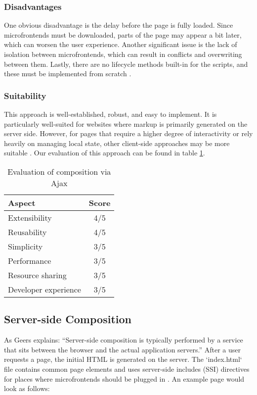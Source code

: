 \subsubsection{Disadvantages}
One obvious disadvantage is the delay before the page is fully loaded. Since microfrontends must be downloaded, parts of the page may appear a bit later, which can worsen the user experience. Another significant issue is the lack of isolation between microfrontends, which can result in conflicts and overwriting between them. Lastly, there are no lifecycle methods built-in for the scripts, and these must be implemented from scratch \cite{Geers}.

\subsubsection{Suitability}
This approach is well-established, robust, and easy to implement. It is particularly well-suited for websites where markup is primarily generated on the server side. However, for pages that require a higher degree of interactivity or rely heavily on managing local state, other client-side approaches may be more suitable \cite{Geers}. Our evaluation of this approach can be found in table \ref{table:ajax-evaluation}.

\begin{table}[h]
  \centering
  \begin{tabular}{|p{4cm}|c|}
    \hline
      \textbf{Aspect} & \textbf{Score} \\
    \hline
      Extensibility & 4/5 \\
    \hline
      Reusability & 4/5 \\
    \hline
      Simplicity & 3/5 \\
    \hline
      Performance & 3/5 \\
    \hline
      Resource sharing & 3/5 \\
    \hline
      Developer experience & 3/5 \\
    \hline
  \end{tabular}
  \caption{Evaluation of composition via Ajax}
  \label{table:ajax-evaluation}
\end{table}


\subsection{Server-side Composition}
As Geers explains: ``Server-side composition is typically performed by a service that sits between the browser and the actual application servers.'' After a user requests a page, the initial HTML is generated on the server. The `index.html` file contains common page elements and uses server-side includes (SSI) directives for places where microfrontends should be plugged in \cite{Jackson}. An example page would look as follows:

